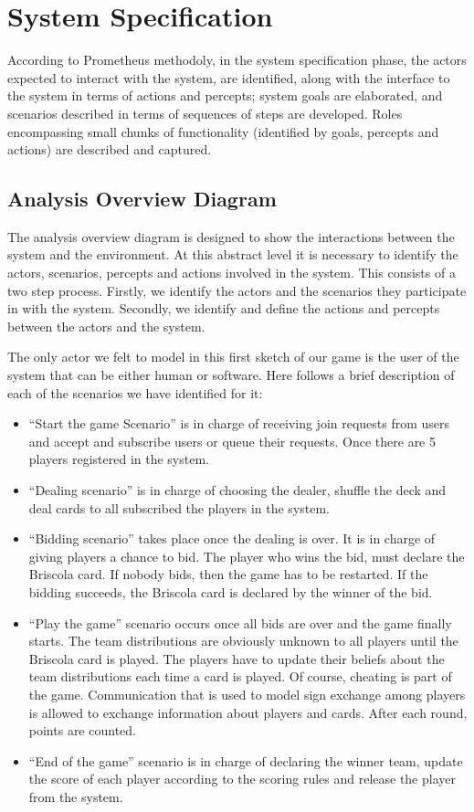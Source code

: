 \documentclass[a4paper]{article}
\begin{document}
\section{System Specification}\label{sec:sysspec} 

According to Prometheus methodoly, in the system specification phase, the actors expected to interact with the system, are identified, along with the interface to the system in terms of actions and percepts; system goals are elaborated, and scenarios described in terms of sequences of steps are developed. Roles encompassing small chunks of functionality (identified by goals, percepts and actions) are described and captured.

\subsection{Analysis Overview Diagram}

The analysis overview diagram is designed to show the interactions between the system and the environment. At this abstract level it is necessary to identify the actors, scenarios, percepts and actions involved in the system. This consists of a two step process. Firstly, we identify the actors and the scenarios they participate in with the system. Secondly, we identify and define the actions and percepts between the actors and the system. 

The only actor we felt to model in this first sketch of our game is the user of the system that can be either human or software. Here follows a brief description of each of the scenarios we have identified for it: 
\begin{itemize}
  \item ``Start the game Scenario'' is in charge of receiving join requests from users and accept and subscribe users or queue their requests. Once there are 5 players registered in the system.
  \item ``Dealing scenario'' is in charge of choosing the dealer, shuffle the deck and deal cards to all subscribed the players in the system. 
  \item ``Bidding scenario'' takes place once the dealing is over. It is in charge of giving players a chance to bid. The player who wins the bid, must declare the Briscola card. If nobody bids, then the game has to be restarted. If the bidding succeeds, the Briscola card is declared by the winner of the bid.
  \item ``Play the game'' scenario occurs once all bids are over and the game finally starts. The team distributions are obviously unknown to all players until the Briscola card is played. The players have to update their beliefs about the team distributions each time a card is played. Of course, cheating is part of the game. Communication that is used to model sign exchange among players is allowed to exchange information about players and cards. After each round, points are counted. 
  \item ``End of the game'' scenario is in charge of declaring the winner team, update the score of each player according to the scoring rules and release the player from the system. 
\end{itemize}
\end{document}
